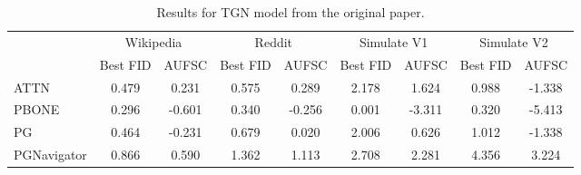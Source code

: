 \begin{table}
\centering
\begin{tabular}{lcccccccc}
\toprule
 & \multicolumn{2}{c}{Wikipedia} & \multicolumn{2}{c}{Reddit} & \multicolumn{2}{c}{Simulate V1} & \multicolumn{2}{c}{Simulate V2} \\
 & Best FID & AUFSC & Best FID & AUFSC & Best FID & AUFSC & Best FID & AUFSC \\
\midrule
ATTN & 0.479 & 0.231 & 0.575 & 0.289 & 2.178 & 1.624 & 0.988 & -1.338 \\
PBONE & 0.296 & -0.601 & 0.340 & -0.256 & 0.001 & -3.311 & 0.320 & -5.413 \\
PG & 0.464 & -0.231 & 0.679 & 0.020 & 2.006 & 0.626 & 1.012 & -1.338 \\
PGNavigator & 0.866 & 0.590 & 1.362 & 1.113 & 2.708 & 2.281 & 4.356 & 3.224 \\
\bottomrule
\end{tabular}
\caption{\label{tab:tgn_results_og}Results for TGN model from the original paper.}
\end{table}
